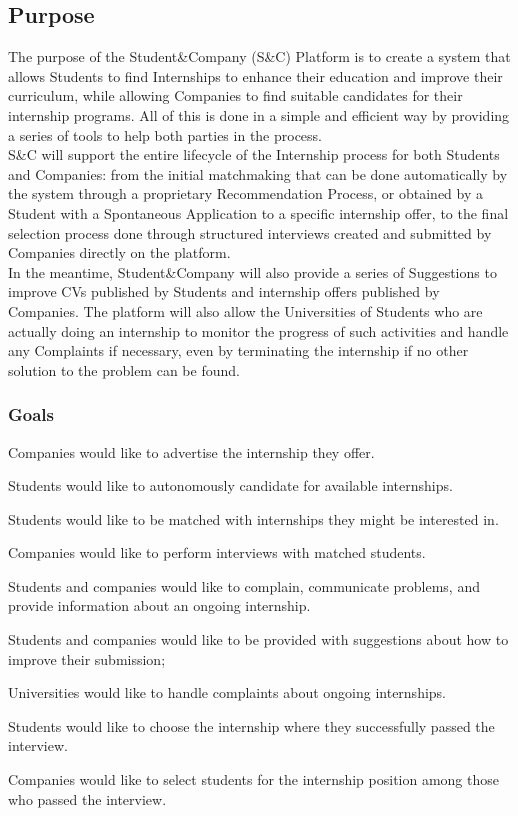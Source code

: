 \subsection{Purpose}
The purpose of the Student\&Company (S\&C) Platform is to create a system that allows Students to find Internships to enhance their education and improve their curriculum, while allowing Companies to find suitable candidates for their internship programs. All of this is done in a simple and efficient way by providing a series of tools to help both parties in the process.\\
S\&C will support the entire lifecycle of the Internship process for both Students and Companies: from the initial matchmaking that can be done automatically by the system through a proprietary Recommendation Process, or obtained by a Student with a Spontaneous Application to a specific internship offer, to the final selection process done through structured interviews created and submitted by Companies directly on the platform.\\%
In the meantime, Student\&Company will also provide a series of Suggestions to improve CVs published by Students and internship offers published by Companies. The platform will also allow the Universities of Students who are actually doing an internship to monitor the progress of such activities and handle any Complaints if necessary, even by terminating the internship if no other solution to the problem can be found.
\subsubsection{Goals}
\begin{enumerate}[label={\color{titleColor}[G\arabic*]}]
\item Companies would like to advertise the internship they offer.
\item Students would like to autonomously candidate for available internships.
\item Students would like to be matched with internships they might be interested in.
\item Companies would like to perform interviews with matched students.
\item Students and companies would like to complain, communicate problems, and provide information about an ongoing internship.
\item Students and companies would like to be provided with suggestions about how to improve their submission;
\item Universities would like to handle complaints about ongoing internships.
\item Students would like to choose the internship where they successfully passed the interview.
\item Companies would like to select students for the internship position among those who passed the interview.
 
\end{enumerate}


